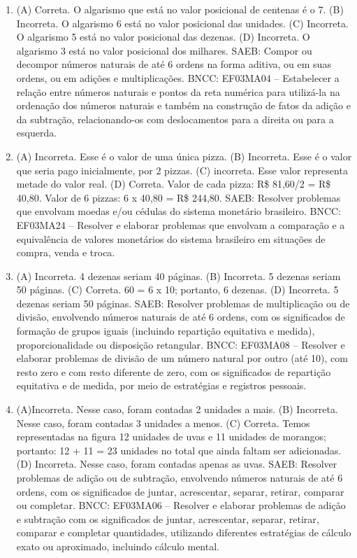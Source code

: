 
\begin{enumerate}
\item
(A) Correta. O algarismo que está no valor posicional de centenas é o 7.
(B) Incorreta. O algarismo 6 está no valor posicional das unidades.
(C) Incorreta. O algarismo 5 está no valor posicional das dezenas.
(D) Incorreta. O algarismo 3 está no valor posicional dos milhares.
SAEB: Compor ou decompor números naturais de até 6 ordens na forma aditiva, ou em suas ordens, ou em adições e multiplicações.
BNCC: EF03MA04 -- Estabelecer a relação entre números naturais e pontos da reta numérica para
utilizá-la na ordenação dos números naturais e também na construção de fatos da adição e da
subtração, relacionando-os com deslocamentos para a direita ou para a esquerda.

\item
(A) Incorreta. Esse é o valor de uma única pizza.
(B) Incorreta. Esse é o valor que seria pago inicialmente, por 2 pizzas.
(C) incorreta. Esse valor representa metade do valor real.
(D) Correta. Valor de cada pizza: R\$ 81,60/2 = R\$ 40,80. Valor de 6 pizzas: 6 x 40,80 = R\$ 244,80.
SAEB: Resolver problemas que envolvam moedas e/ou cédulas do sistema monetário brasileiro.
BNCC: EF03MA24 -- Resolver e elaborar problemas que envolvam a comparação e a equivalência de
valores monetários do sistema brasileiro em situações de compra, venda e troca.

\item
(A) Incorreta. 4 dezenas seriam 40 páginas.
(B) Incorreta. 5 dezenas seriam 50 páginas.
(C) Correta. 60 = 6 x 10; portanto, 6 dezenas.
(D) Incorreta. 5 dezenas seriam 50 páginas.
SAEB: Resolver problemas de multiplicação ou de divisão, envolvendo números naturais de até 6 ordens, com os significados de formação de grupos iguais (incluindo repartição equitativa e medida),
proporcionalidade ou disposição retangular.
BNCC: EF03MA08 -- Resolver e elaborar problemas de divisão de um número natural por outro (até
10), com resto zero e com resto diferente de zero, com os significados de repartição equitativa
e de medida, por meio de estratégias e registros pessoais.

\item
(A)Incorreta. Nesse caso, foram contadas 2 unidades a mais.
(B) Incorreta. Nesse caso, foram contadas 3 unidades a menos.
(C) Correta. Temos representadas na figura 12 unidades de uvas e 11 unidades de morangos; portanto: 12 + 11 = 23 unidades no total que ainda faltam ser adicionadas.
(D) Incorreta. Nesse caso, foram contadas apenas as uvas.
SAEB: Resolver problemas de adição ou de subtração,
envolvendo números naturais de até 6 ordens, com os significados de
juntar, acrescentar, separar, retirar, comparar ou completar.
BNCC: EF03MA06 – Resolver e elaborar problemas de adição e subtração com os significados de
juntar, acrescentar, separar, retirar, comparar e completar quantidades, utilizando diferentes
estratégias de cálculo exato ou aproximado, incluindo cálculo mental.


\end{enumerate}
